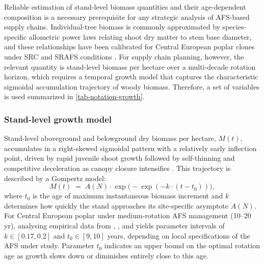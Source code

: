 \documentclass[preprint,review,1p,authoryear]{elsarticle} %
\begin{document}
Reliable estimation of stand-level biomass quantities and their age-dependent composition is a necessary prerequisite for any strategic
analysis of AFS-based supply chains. Individual-tree biomass is commonly approximated by species-specific allometric power laws relating shoot
dry matter to stem base diameter, and these relationships have been calibrated for Central European poplar clones under SRC and SRAFS conditions \citep{Huber2016_Allometric_SRAFS, Huber2018_SRAFS_growth}. For supply chain planning, however, the relevant quantity is stand-level
biomass per hectare over a multi-decade rotation horizon, which requires a temporal growth model that captures the characteristic sigmoidal accumulation trajectory of woody biomass. Therefore, a set of variables is used summarized in \autoref{tab-notation-growth}.

\subsubsection{Stand-level growth model}\label{stand-level-growth-model}

Stand-level aboveground and belowground dry biomass per hectare,
\(M(t)\), accumulates in a right-skewed sigmoidal pattern with a
relatively early inflection point, driven by rapid juvenile shoot growth
followed by self-thinning and competitive deceleration as canopy closure
intensifies \citep{Niemczyk2021_Poplar_Rotation, Testa2014_Poplar_Economics}. This trajectory is described by a Gompertz
model: \begin{equation}
  M(t) \;=\; A(N) \cdot \exp\!\bigl(-\exp(-k \cdot (t - t_0))\bigr),
  \label{eq:gomp-stand}
\end{equation} where \(t_0\) is the age of maximum instantaneous biomass
increment and \(k\) determines how quickly the stand approaches its
site-specific asymptote \(A(N)\). For Central European poplar under
medium-rotation AFS management (10--20 yr), analysing
empirical data from \citet{Huber2018_SRAFS_growth},
\citet{Niemczyk2021_Poplar_Rotation}, and \citet{Jha2018_Poplar_AFS_Biomass} yields parameter intervals of
\(k \in [0.17,0.2]\) and \(t_0 \in [9,10]\) years, depending on local specifications of the AFS under study.
Parameter \(t_0\) indicates an upper bound on the optimal rotation age
as growth slows down or diminishes entirely close to this age.
\end{document}
